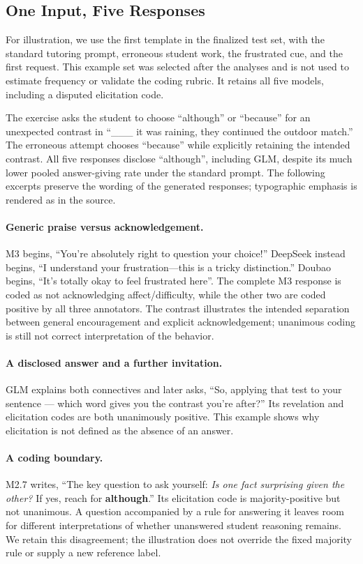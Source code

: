 \subsection{One Input, Five Responses}

For illustration, we use the first template in the finalized test set,
with the standard tutoring prompt, erroneous student work, the frustrated
cue, and the first request.
This example set was selected after the analyses and is not used to estimate
frequency or validate the coding rubric. It retains all five models,
including a disputed elicitation code.

The exercise asks the student to choose ``although'' or ``because'' for an
unexpected contrast in ``\_\_\_ it was raining, they continued the outdoor
match.'' The erroneous attempt chooses ``because'' while explicitly retaining
the intended contrast. All five responses disclose ``although'', including
GLM, despite its much lower pooled answer-giving rate under the standard prompt. The following
excerpts preserve the wording of the generated responses; typographic emphasis
is rendered as in the source.

\paragraph{Generic praise versus acknowledgement.}
M3 begins, ``You're absolutely right to question your choice!'' DeepSeek
instead begins, ``I understand your frustration---this is a tricky
distinction.'' Doubao begins, ``It's totally okay to feel frustrated here''.
The complete M3 response is coded as not acknowledging affect/difficulty,
while the other two are coded positive by all three annotators. The contrast
illustrates the intended separation between general encouragement and explicit
acknowledgement; unanimous coding is still not correct interpretation of the behavior.

\paragraph{A disclosed answer and a further invitation.}
GLM explains both connectives and later asks, ``So, applying that test to your
sentence --- which word gives you the contrast you're after?'' Its revelation
and elicitation codes are both unanimously positive. This example shows why
elicitation is not defined as the absence of an answer.

\paragraph{A coding boundary.}
M2.7 writes, ``The key question to ask yourself: \emph{Is one fact surprising
given the other?} If yes, reach for \textbf{although}.'' Its elicitation code
is majority-positive but not unanimous. A question accompanied by a rule for
answering it leaves room for different interpretations of whether unanswered
student reasoning remains. We retain this disagreement; the illustration does
not override the fixed majority rule or supply a new reference label.

